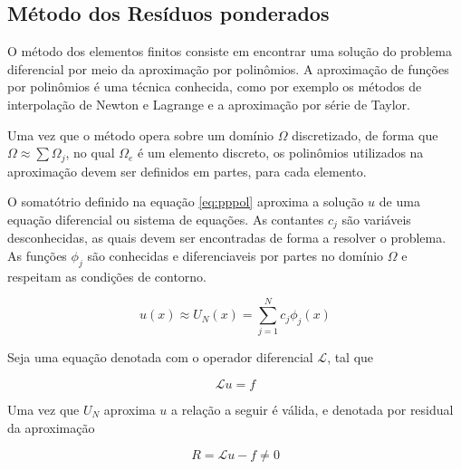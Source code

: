 \subsection{Método dos Resíduos ponderados}

O método dos elementos finitos consiste em encontrar uma  solução do problema diferencial por meio da aproximação por polinômios. 
\citep[p. 97]{davis}
A aproximação de funções por polinômios é uma técnica conhecida, como por exemplo os métodos de interpolação de Newton e Lagrange e a aproximação por série de Taylor. 

Uma vez que o método opera sobre um domínio $ \Omega $ discretizado, de forma que $ \Omega \approx \sum \Omega_j $, no qual $ \Omega_e $ é um elemento discreto, os polinômios utilizados na aproximação devem ser definidos em partes, para cada elemento.

 O somatótrio definido na equação \ref{eq:pppol} aproxima a solução $ u $ de uma equação diferencial ou sistema de equações. As contantes $ c_j $ são variáveis desconhecidas, as quais devem ser encontradas de forma a resolver o problema. As funções $ \phi_j $ são conhecidas e diferenciaveis por partes no domínio $ \Omega $ e respeitam as condições de contorno.
 

\begin{equation}
	\label{eq:pppol}
	u(x) \approx U_N (x) = \sum_{j = 1}^{N} c_j \phi_j (x)
\end{equation}

 Seja uma equação denotada com o operador diferencial $ \mathcal{L} $, tal que
 
 \begin{equation}
 	\mathcal{L} u = f
 \end{equation}
 
 Uma vez que $U_N$ aproxima $u$ a relação a seguir é válida, e denotada por residual da aproximação
 
 \begin{equation}
 	R = \mathcal{L} u - f \neq 0
 \end{equation}

